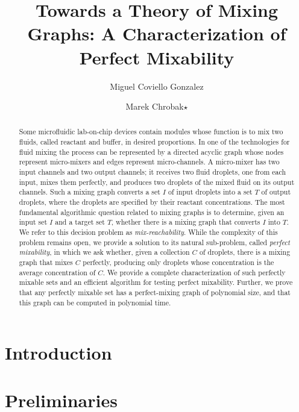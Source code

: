 \documentclass[a4paper,UKenglish]{lipics-v2018}
\title{Towards a Theory of Mixing Graphs:
A Characterization of Perfect Mixability}
\author{Miguel Coviello Gonzalez}{Department of Computer Science\\ University of California at Riverside}{}{}{}
\author{Marek Chrobak$\star$}{Department of Computer Science\\ University of California at Riverside}{}{}{}%
\begin{document}
	
\maketitle

\begin{abstract}
	Some microfluidic lab-on-chip devices contain modules whose function is to mix two
	fluids, called reactant and buffer, in desired proportions. 
	In one of the technologies for fluid mixing the process
	can be represented by a directed acyclic graph whose nodes represent micro-mixers
	and edges represent micro-channels. 
	A micro-mixer has two input channels and two output channels;
	it receives two fluid droplets, one from each input, mixes them perfectly, and produces two
	droplets of the mixed fluid on its output channels. Such a mixing graph converts a
	set $I$ of input droplets into a set $T$ of output droplets, where the droplets are specified
	by their reactant concentrations. 
	The most fundamental algorithmic question related to mixing graphs is to determine,
	given an input set $I$ and a target set $T$, whether there is a mixing graph
	that converts $I$ into $T$. We refer to this decision problem as \emph{mix-reachability}.
	While the complexity of this problem remains open, we provide a 
	solution to its natural sub-problem, called \emph{perfect mixability}, 
	in which we ask whether, given a collection $C$ of droplets,
	there is a mixing graph that mixes $C$ perfectly,
	producing only droplets whose concentration is the average concentration of $C$.
	We provide a complete characterization of such perfectly mixable sets and 
	an efficient algorithm for testing perfect mixability. Further, we prove
	that any perfectly mixable set has a perfect-mixing graph of polynomial size, and that
	this graph can be computed in polynomial time.
\end{abstract}



\section{Introduction}
\label{sec: introduction}



\section{Preliminaries}
\label{sec: preliminaries}

\end{document}
